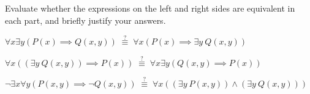 \documentclass[11pt]{article}
\begin{document}
\newpage {}

Evaluate whether the expressions on the left and right sides are equivalent in each part, and briefly justify your answers.

\begin{Parts}
    \Part $\forall x \exists y \left(P(x) \implies Q(x,y)\right) \;\overset{?}{\equiv}\; \forall x \left(P(x) \implies \exists y~Q(x,y)\right)$

    \Part $\forall x \left((\exists y~Q(x,y)) \implies P(x)\right) \;\overset{?}{\equiv}\; \forall x \exists y \left(Q(x,y) \implies P(x)\right)$

    \Part $\lnot \exists x \forall y \left(P(x,y) \implies \lnot Q(x,y)\right) \;\overset{?}{\equiv}\; \forall x \left( (\exists y~P(x,y)) \land (\exists y~Q(x,y)) \right)$
\end{Parts}
\end{document}
